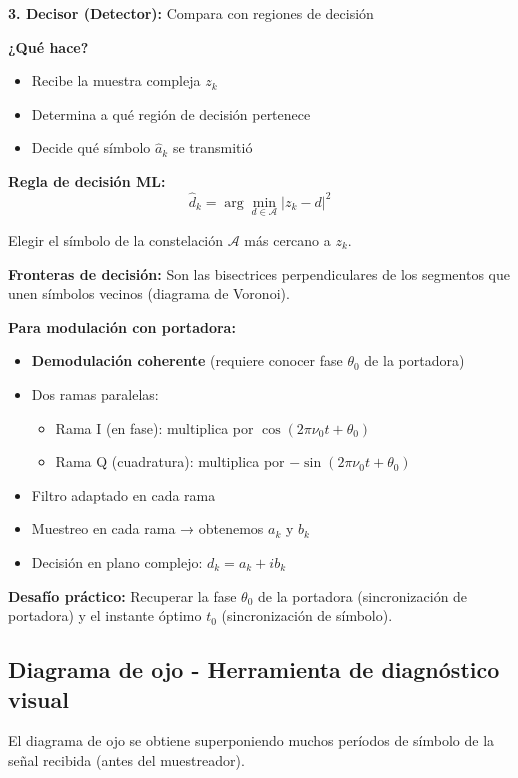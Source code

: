 \documentclass[10pt,a4paper]{article}
\begin{document}
\begin{tcolorbox}[colback=azulclaro!10,colframe=azuloscuro,title=Receptor ML: Tres bloques fundamentales]
\textbf{3. Decisor (Detector):} Compara con regiones de decisión

\textbf{¿Qué hace?}
\begin{itemize}
\item Recibe la muestra compleja $z_k$
\item Determina a qué región de decisión pertenece
\item Decide qué símbolo $\hat{a}_k$ se transmitió
\end{itemize}

\textbf{Regla de decisión ML:}
$$\hat{d}_k = \arg\min_{d \in \mathcal{A}} |z_k - d|^2$$

Elegir el símbolo de la constelación $\mathcal{A}$ más cercano a $z_k$.

\textbf{Fronteras de decisión:} Son las bisectrices perpendiculares de los segmentos que unen símbolos vecinos (diagrama de Voronoi).

\textbf{Para modulación con portadora:}
\begin{itemize}
\item \textbf{Demodulación coherente} (requiere conocer fase $\theta_0$ de la portadora)
\item Dos ramas paralelas:
  \begin{itemize}
  \item Rama I (en fase): multiplica por $\cos(2\pi\nu_0 t + \theta_0)$
  \item Rama Q (cuadratura): multiplica por $-\sin(2\pi\nu_0 t + \theta_0)$
  \end{itemize}
\item Filtro adaptado en cada rama
\item Muestreo en cada rama → obtenemos $a_k$ y $b_k$
\item Decisión en plano complejo: $d_k = a_k + ib_k$
\end{itemize}

\textbf{Desafío práctico:} Recuperar la fase $\theta_0$ de la portadora (sincronización de portadora) y el instante óptimo $t_0$ (sincronización de símbolo).
\end{tcolorbox}

\subsection{Diagrama de ojo - Herramienta de diagnóstico visual}

El diagrama de ojo se obtiene superponiendo muchos períodos de símbolo de la señal recibida (antes del muestreador).
\end{document}
